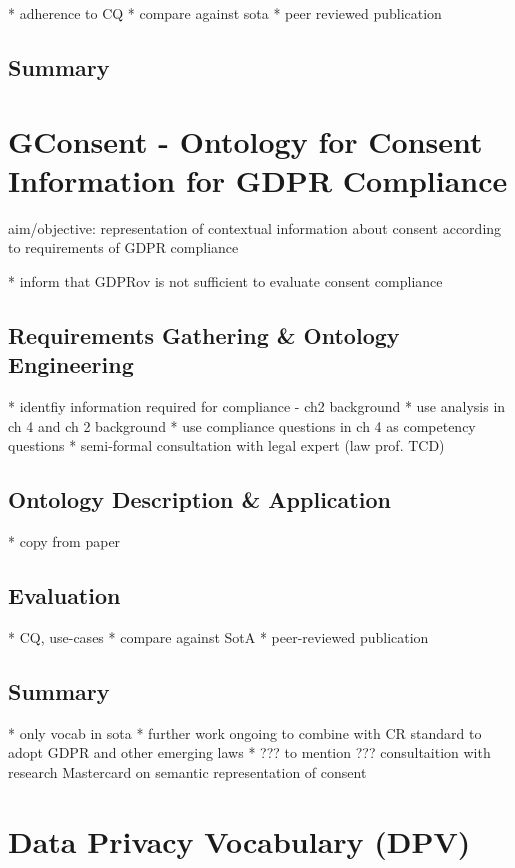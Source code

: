 * adherence to CQ
* compare against sota
* peer reviewed publication

\subsection*{Summary}

\section{GConsent - Ontology for Consent Information for GDPR Compliance}\label{sec:voc:GConsent}

aim/objective: representation of contextual information about consent according to requirements of GDPR compliance

* inform that GDPRov is not sufficient to evaluate consent compliance

\subsection{Requirements Gathering \& Ontology Engineering}

* identfiy information required for compliance - ch2 background
* use analysis in ch 4 and ch 2 background
* use compliance questions in ch 4 as competency questions
* semi-formal consultation with legal expert (law prof. TCD)

\subsection{Ontology Description \& Application}

* copy from paper

\subsection{Evaluation}

* CQ, use-cases
* compare against SotA
* peer-reviewed publication

\subsection*{Summary}

* only vocab in sota
* further work ongoing to combine with CR standard to adopt GDPR and other emerging laws
* ??? to mention ??? consultaition with research Mastercard on semantic representation of consent

\section{Data Privacy Vocabulary (DPV)}\label{sec:voc:DPV}

